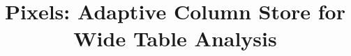 \documentclass{vldb}
\begin{document}
	
	
	\title{Pixels: Adaptive Column Store for Wide Table Analysis}
	
	
	
	
	
	
\end{document}
